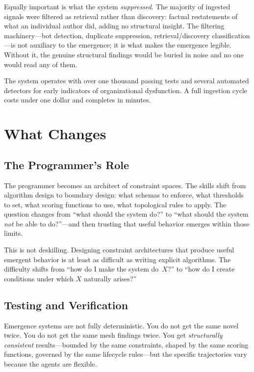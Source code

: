 \documentclass[11pt,twocolumn]{article}
\begin{document}
Equally important is what the system \emph{suppressed.}  The majority
of ingested signals were filtered as retrieval rather than discovery:
factual restatements of what an individual author did, adding no
structural insight.  The filtering machinery---bot detection, duplicate
suppression, retrieval/discovery classification---is not auxiliary to the
emergence; it is what makes the emergence legible.  Without it, the
genuine structural findings would be buried in noise and no one would
read any of them.

The system operates with over one thousand passing tests and several
automated detectors for early indicators of organizational dysfunction.
A full ingestion cycle costs under one dollar and completes in minutes.

\section{What Changes}
\label{sec:changes}

\subsection{The Programmer's Role}

The programmer becomes an architect of constraint spaces.  The skills
shift from algorithm design to boundary design: what schemas to enforce,
what thresholds to set, what scoring functions to use, what topological
rules to apply.  The question changes from ``what should the system
do?'' to ``what should the system \emph{not} be able to do?''---and
then trusting that useful behavior emerges within those limits.

This is not deskilling.  Designing constraint architectures that produce
useful emergent behavior is at least as difficult as writing explicit
algorithms.  The difficulty shifts from ``how do I make the system
do~$X$?'' to ``how do I create conditions under which $X$ naturally
arises?''

\subsection{Testing and Verification}

Emergence systems are not fully deterministic.  You do not get the same
novel twice.  You do not get the same mesh findings twice.  You get
\emph{structurally consistent} results---bounded by the same
constraints, shaped by the same scoring functions, governed by the same
lifecycle rules---but the specific trajectories vary because the agents
are flexible.
\end{document}
